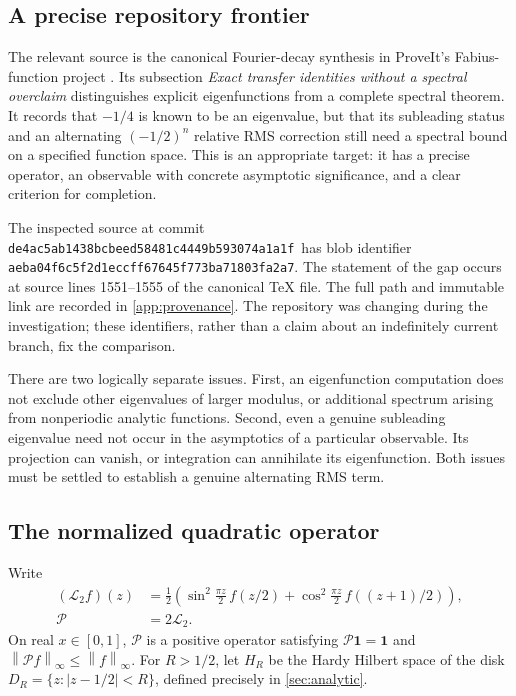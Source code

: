 \documentclass[11pt,a4paper]{article}
\theoremstyle{definition}
\theoremstyle{remark}
\newcommand{\one}{\mathbf 1}
\newcommand{\Lop}{\mathcal L}
\newcommand{\Pop}{\mathcal P}
\newcommand{\norm}[1]{\left\|#1\right\|}
\newcommand{\repoSHA}{\texttt{de4ac5ab1438bcbeed58481c4449b593074a1a1f}}
\newcommand{\blobSHA}{\texttt{aeba04f6c5f2d1eccff67645f773ba71803fa2a7}}
\numberwithin{equation}{section}
\begin{document}
\subsection{A precise repository frontier}
The relevant source is the canonical Fourier-decay synthesis in
ProveIt's Fabius-function project \cite{repo}. Its subsection
\emph{Exact transfer identities without a spectral overclaim} distinguishes
explicit eigenfunctions from a complete spectral theorem. It records that
$-1/4$ is known to be an eigenvalue, but that its subleading status and an
alternating $(-1/2)^n$ relative RMS correction still need a spectral bound on
a specified function space. This is an appropriate target: it has a precise
operator, an observable with concrete asymptotic significance, and a clear
criterion for completion.

The inspected source at commit \repoSHA\ has blob identifier \blobSHA.
The statement of the gap occurs at source lines 1551--1555 of the canonical
TeX file. The full path and immutable link are recorded in
\cref{app:provenance}. The repository was changing during the investigation;
these identifiers, rather than a claim about an indefinitely current branch,
fix the comparison.

There are two logically separate issues. First, an eigenfunction computation
does not exclude other eigenvalues of larger modulus, or additional spectrum
arising from nonperiodic analytic functions. Second, even a genuine
subleading eigenvalue need not occur in the asymptotics of a particular
observable. Its projection can vanish, or integration can annihilate its
eigenfunction. Both issues must be settled to establish a genuine alternating
RMS term.

\subsection{The normalized quadratic operator}
Write
\begin{align}
 (\Lop_2 f)(z)
 &=\frac12\left(\sin^2\frac{\pi z}{2}\,f(z/2)
       +\cos^2\frac{\pi z}{2}\,f((z+1)/2)\right),\label{eq:L2intro}\\
 \Pop&=2\Lop_2.
\end{align}
On real $x\in[0,1]$, $\Pop$ is a positive operator satisfying
$\Pop\one=\one$ and $\norm{\Pop f}_\infty\le\norm f_\infty$.
For $R>1/2$, let $H_R$ be the Hardy Hilbert space of the disk
$D_R=\{z:|z-1/2|<R\}$, defined precisely in \cref{sec:analytic}.
\end{document}
